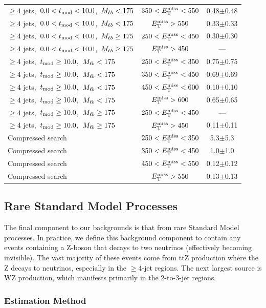 \begin{table}[htbp]
\begin{tabular}{|l|c|c|}
$\ge4$ jets,~$0.0< t_\text{mod} <10.0$,~$M_{\ell b} <175$ & $350<E_\text{T}^\text{miss}<550$ &  0.48$\pm$0.48  \\
$\ge4$ jets,~$0.0< t_\text{mod} <10.0$,~$M_{\ell b} <175$ & $E_\text{T}^\text{miss}>550$     &  0.33$\pm$0.33  \\
\hline
$\ge4$ jets,~$0.0< t_\text{mod} <10.0$,~$M_{\ell b} \ge175$ & $250<E_\text{T}^\text{miss}<450$ &  0.30$\pm$0.30  \\
$\ge4$ jets,~$0.0< t_\text{mod} <10.0$,~$M_{\ell b} \ge175$ & $E_\text{T}^\text{miss}>450$     &  ---  \\
\hline
$\ge4$ jets,~$t_\text{mod} \ge10.0$,~$M_{\ell b} <175$ & $250<E_\text{T}^\text{miss}<350$ &  0.75$\pm$0.75  \\
$\ge4$ jets,~$t_\text{mod} \ge10.0$,~$M_{\ell b} <175$ & $350<E_\text{T}^\text{miss}<450$ &  0.69$\pm$0.69  \\
$\ge4$ jets,~$t_\text{mod} \ge10.0$,~$M_{\ell b} <175$ & $450<E_\text{T}^\text{miss}<600$ &  0.10$\pm$0.10 \\
$\ge4$ jets,~$t_\text{mod} \ge10.0$,~$M_{\ell b} <175$ & $E_\text{T}^\text{miss}>600$     &  0.65$\pm$0.65  \\
\hline
$\ge4$ jets,~$t_\text{mod} \ge10.0$,~$M_{\ell b} \ge175$ & $250<E_\text{T}^\text{miss}<450$ &  ---  \\
$\ge4$ jets,~$t_\text{mod} \ge10.0$,~$M_{\ell b} \ge175$ & $E_\text{T}^\text{miss}>450$     &  0.11$\pm$0.11 \\
\hline
Compressed search & $250<E_\text{T}^\text{miss}<350$ & 5.3$\pm$5.3 \\
Compressed search & $350<E_\text{T}^\text{miss}<450$ & 1.0$\pm$1.0 \\
Compressed search & $450<E_\text{T}^\text{miss}<550$ & 0.12$\pm$0.12 \\
Compressed search & $E_\text{T}^\text{miss}>550$     & 0.13$\pm$0.13 \\
\hline
\end{tabular}
\end{table}

\subsection{Rare Standard Model Processes}
\label{ssec:stop:rarebkg}

The final component to our backgrounds is that from
rare Standard Model processes. In practice, we define this background
component to contain any events containing a Z-boson that decays to
two neutrinos (effectively becoming invisible). The vast majority of
these events come from ttZ production where the Z decays to
neutrinos, especially in the $\geq$4-jet regions. The next largest
source is WZ production, which manifests primarily in the 2-to-3-jet
regions.

\subsubsection{Estimation Method}
\label{sssec:stop:rarebkg:estimation}

